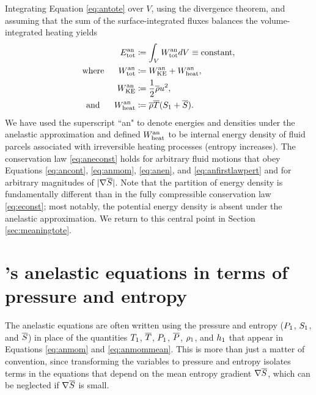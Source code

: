 \documentclass[12pt]{article}
\newcommand{\anetot}{E_{\rm tot}^{\rm an}}
\newcommand{\anwtot}{W^{\rm an}_{\rm tot}}
\newcommand{\anwke}{W^{\rm an}_{\rm KE}}
\newcommand{\anwheat}{W^{\rm an}_{\rm heat}}
\begin{document}
 Integrating Equation \eqref{eq:antote} over $V$, using the divergence theorem, and assuming that the sum of the surface-integrated fluxes balances the volume-integrated heating yields
 \begin{subequations}\label{eq:aneconst}
 	\begin{align}
 		\anetot &\define \int_V \anwtot dV \equiv \text{constant},\\
 		\where \anwtot &\define \anwke + \anwheat,\\
 		\anwke &\define \frac{1}{2}\rhoover u^2,\\
 		\andd \anwheat &\define \rhoover \tmpover (\entrone+\entrover).
 	\end{align}
 \end{subequations}
 We have used the superscript ``an" to denote energies and densities under the anelastic approximation and defined $\anwheat$ to be internal energy density of fluid parcels associated with irreversible heating processes (entropy increases). The conservation law \eqref{eq:aneconst} holds for arbitrary fluid motions that obey Equations \eqref{eq:ancont}, \eqref{eq:anmom}, \eqref{eq:anen}, and \eqref{eq:anfirstlawpert} and for arbitrary magnitudes of $|\nabla \overline{S}|$. Note that the partition of energy density is fundamentally different than in the fully compressible conservation law \eqref{eq:econst}; most notably, the potential energy density is absent under the anelastic approximation. We return to this central point in Section \ref{sec:meaningtote}. %

\section{\citet{Gough1969}'s anelastic equations in terms of pressure and entropy}\label{sec:goughps}
The anelastic equations are often written using the pressure and entropy ($P_1$, $S_1$, and $\overline{S}$) in place of the quantities $T_1$, $\overline{T}$, $P_1$, $\overline{P}$, $\rho_1$, and $h_1$ that appear in Equations \eqref{eq:anmom} and \eqref{eq:anmommean}. This is more than just a matter of convention, since transforming the variables to pressure and entropy isolates terms in the equations that depend on the mean entropy gradient $\nabla\overline{S}$, which can be neglected if $\nabla\overline{S}$ is small.
\end{document}
